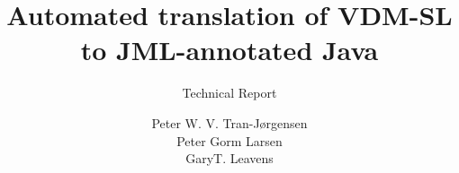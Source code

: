 \documentclass{ase}
\title{Automated translation of VDM-SL to JML-annotated Java}
\subtitle{Technical Report}
\author{Peter W. V. Tran-J\o{}rgensen\\Peter Gorm
  Larsen\\GaryT. Leavens}
\begin{document}
\maketitle
\frontmatter
\asetableofcontents

\mainmatter



\acresetall



\begin{appendices}
  
  
  
\end{appendices}



\end{document}
